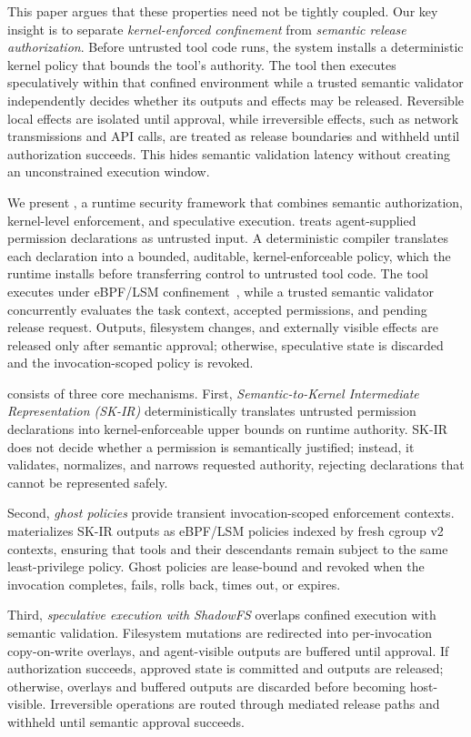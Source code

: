 This paper argues that these properties need not be tightly coupled. Our key
insight is to separate \emph{kernel-enforced confinement} from \emph{semantic
release authorization}. Before untrusted tool code runs, the system installs a
deterministic kernel policy that bounds the tool's authority. The tool then
executes speculatively within that confined environment while a trusted semantic
validator independently decides whether its outputs and effects may be released.
Reversible local effects are isolated until approval, while irreversible effects,
such as network transmissions and API calls, are treated as release boundaries
and withheld until authorization succeeds. This hides semantic validation latency
without creating an unconstrained execution window.

We present \SystemName, a runtime security framework that combines semantic
authorization, kernel-level enforcement, and speculative execution.
\SystemName treats agent-supplied permission declarations as untrusted input. A
deterministic compiler translates each declaration into a bounded, auditable,
kernel-enforceable policy, which the runtime installs before transferring
control to untrusted tool code. The tool executes under eBPF/LSM
confinement~\cite{gbadamosi2024ebpf,wright2002lsm}, while a trusted semantic
validator concurrently evaluates the task context, accepted permissions, and
pending release request. Outputs, filesystem changes, and externally visible
effects are released only after semantic approval; otherwise, speculative state
is discarded and the invocation-scoped policy is revoked.

\SystemName consists of three core mechanisms. First,
\emph{Semantic-to-Kernel Intermediate Representation (SK-IR)} deterministically
translates untrusted permission declarations into kernel-enforceable upper
bounds on runtime authority. SK-IR does not decide whether a permission is
semantically justified; instead, it validates, normalizes, and narrows requested
authority, rejecting declarations that cannot be represented safely.

Second, \emph{ghost policies} provide transient invocation-scoped enforcement
contexts. \SystemName materializes SK-IR outputs as eBPF/LSM policies indexed by
fresh cgroup v2 contexts, ensuring that tools and their descendants remain
subject to the same least-privilege policy. Ghost policies are lease-bound and
revoked when the invocation completes, fails, rolls back, times out, or expires.

Third, \emph{speculative execution with ShadowFS} overlaps confined execution
with semantic validation. Filesystem mutations are redirected into
per-invocation copy-on-write overlays, and agent-visible outputs are buffered
until approval. If authorization succeeds, approved state is committed and
outputs are released; otherwise, overlays and buffered outputs are discarded
before becoming host-visible. Irreversible operations are routed through
mediated release paths and withheld until semantic approval succeeds.

